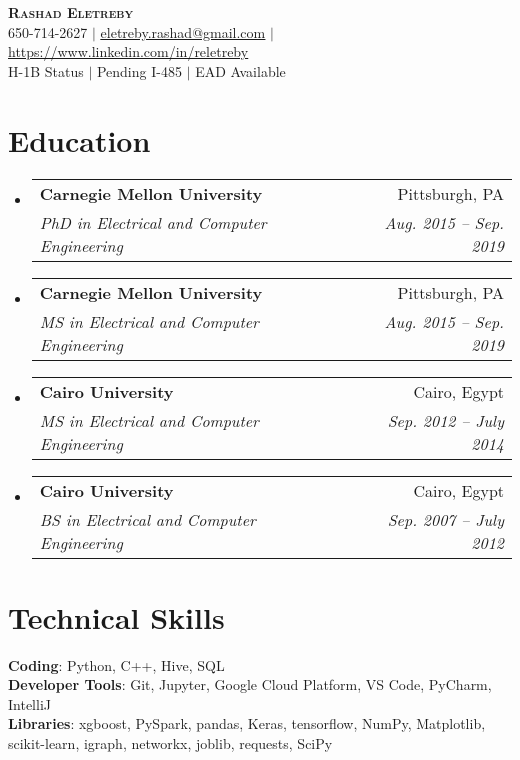 \documentclass[letterpaper,11pt]{article}
\makeatletter
\newcommand{\resumeSubheading}[4]{
  \vspace{-2pt}\item
    \begin{tabular*}{0.97\textwidth}[t]{l@{\extracolsep{\fill}}r}
      \textbf{#1} & #2 \\
      \textit{\small#3} & \textit{\small #4} \\
    \end{tabular*}\vspace{-7pt}
}
\newcommand{\resumeSubHeadingListStart}{\begin{itemize}[leftmargin=0.15in, label={}]}
\newcommand{\resumeSubHeadingListEnd}{\end{itemize}}
\makeatother
\begin{document}

\begin{center}
    \textbf{\Huge \scshape Rashad Eletreby} \\ \vspace{1pt}
    \small 650-714-2627 $|$ \href{mailto:eletreby.rashad@gmail.com}{\underline{eletreby.rashad@gmail.com}} $|$ 
    \href{https://www.linkedin.com/in/reletreby}{\underline{https://www.linkedin.com/in/reletreby}} 
    \\ \vspace{1mm}
    \small H-1B Status $|$ Pending I-485 $|$ EAD Available
\end{center}


\section{Education}
  \resumeSubHeadingListStart
    \resumeSubheading
      {Carnegie Mellon University}{Pittsburgh, PA}
      {PhD in Electrical and Computer Engineering}{Aug. 2015 -- Sep. 2019}
      
     \vspace{1mm}
    \resumeSubheading
      {Carnegie Mellon University}{Pittsburgh, PA}
      {MS in Electrical and Computer Engineering}{Aug. 2015 -- Sep. 2019}
      
       \vspace{1mm}
    \resumeSubheading
      {Cairo University}{Cairo, Egypt}
      {MS in Electrical and Computer Engineering}{Sep. 2012 -- July 2014}
      
      \vspace{1mm}
    \resumeSubheading
      {Cairo University}{Cairo, Egypt}
      {BS in Electrical and Computer Engineering}{Sep. 2007 -- July 2012}
  \resumeSubHeadingListEnd


\vspace{1mm}
\section{Technical Skills}
 \begin{itemize}[leftmargin=0.15in, label={}]
    \small{\item{
     \textbf{Coding}{: Python, C++, Hive, SQL} \\
     \textbf{Developer Tools}{: Git, Jupyter, Google Cloud Platform, VS Code, PyCharm, IntelliJ} \\
     \textbf{Libraries}{: xgboost, PySpark, pandas, Keras, tensorflow, NumPy, Matplotlib, scikit-learn, igraph, networkx, joblib, requests, SciPy}
    }}
 \end{itemize}
 
\end{document}
